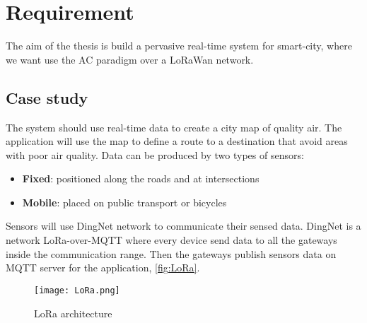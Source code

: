 \chapter{Requirement}

The aim of the thesis is build a pervasive real-time system for smart-city, where we want use the AC paradigm over a LoRaWan network.

\section{Case study}

The system should use real-time data to create a city map of quality air.
The application will use the map to define a route to a destination that avoid areas with poor air quality.
Data can be produced by two types of sensors:
\begin{itemize}
    \item \textbf{Fixed}: positioned along the roads and at intersections
    \item \textbf{Mobile}: placed on public transport or bicycles
\end{itemize}

Sensors will use DingNet network to communicate their sensed data. DingNet is a network LoRa-over-MQTT where every device send data to all the gateways inside the communication range. Then the gateways publish sensors data on MQTT server for the application, \autoref{fig:LoRa}.

\begin{figure}[h]
    \centering
    \texttt{[image: LoRa.png]}
    \caption{LoRa architecture}
    \label{fig:LoRa}
\end{figure}